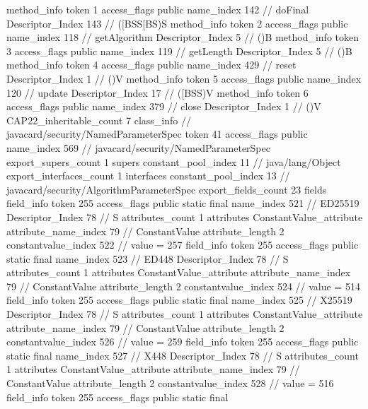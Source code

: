 {{{{{				}
				method_info {
					token	1
					access_flags	public
					name_index	142		// doFinal
					Descriptor_Index	143		// ([BSS[BS)S
				}
				method_info {
					token	2
					access_flags	public
					name_index	118		// getAlgorithm
					Descriptor_Index	5		// ()B
				}
				method_info {
					token	3
					access_flags	public
					name_index	119		// getLength
					Descriptor_Index	5		// ()B
				}
				method_info {
					token	4
					access_flags	public
					name_index	429		// reset
					Descriptor_Index	1		// ()V
				}
				method_info {
					token	5
					access_flags	public
					name_index	120		// update
					Descriptor_Index	17		// ([BSS)V
				}
				method_info {
					token	6
					access_flags	public
					name_index	379		// close
					Descriptor_Index	1		// ()V
				}
			}
			CAP22_inheritable_count	7
		}
		class_info {		// javacard/security/NamedParameterSpec
			token	41
			access_flags	public
			name_index	569		// javacard/security/NamedParameterSpec
			export_supers_count	1
			supers {
				constant_pool_index	11		// java/lang/Object
			}
			export_interfaces_count	1
			interfaces {
				constant_pool_index	13		// javacard/security/AlgorithmParameterSpec
			}
			export_fields_count	23
			fields {
			field_info {
				token	255
				access_flags	public static final
				name_index	521		// ED25519
				Descriptor_Index	78		// S
				attributes_count	1
				attributes {
				ConstantValue_attribute {
					attribute_name_index	79		// ConstantValue
					attribute_length	2
					constantvalue_index	522		// value = 257
				}
				}
			}
			field_info {
				token	255
				access_flags	public static final
				name_index	523		// ED448
				Descriptor_Index	78		// S
				attributes_count	1
				attributes {
				ConstantValue_attribute {
					attribute_name_index	79		// ConstantValue
					attribute_length	2
					constantvalue_index	524		// value = 514
				}
				}
			}
			field_info {
				token	255
				access_flags	public static final
				name_index	525		// X25519
				Descriptor_Index	78		// S
				attributes_count	1
				attributes {
				ConstantValue_attribute {
					attribute_name_index	79		// ConstantValue
					attribute_length	2
					constantvalue_index	526		// value = 259
				}
				}
			}
			field_info {
				token	255
				access_flags	public static final
				name_index	527		// X448
				Descriptor_Index	78		// S
				attributes_count	1
				attributes {
				ConstantValue_attribute {
					attribute_name_index	79		// ConstantValue
					attribute_length	2
					constantvalue_index	528		// value = 516
				}
				}
			}
			field_info {
				token	255
				access_flags	public static final
}}}}}
